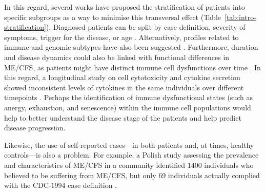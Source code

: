 In this regard, several works have proposed the stratification of \cfs patients into specific subgroups as a way to minimise this transversal effect (Table~\ref{tab:intro-stratification}).
Diagnosed patients can be split by case definition, severity of symptoms, trigger for the disease, or age \citep{janal2006SubtypingCFS, lewis2013ChronicFatigue, hardcastle2014AnalysisRelationship, domingues2021HerpesvirusesSerologya}.
Alternatively, profiles related to immune and genomic subtypes have also been suggested \citep{kerr2007SevenGenomic, kerr2008GeneExpression, vegaIntegrationDNAMethylation2018}.
Furthermore, duration and disease dynamics could also be linked with functional differences in ME/CFS, as patients might have distinct immune cell dysfunctions over time \citep{maya2023SurveyingMetabolic}.
In this regard, a longitudinal study on cell cytotoxicity and cytokine secretion showed inconsistent levels of cytokines in the same individuals over different timepoints \citep{brenu2012LongitudinalInvestigation}.
Perhaps the identification of immune dysfunctional states (such as anergy, exhaustion, and senescence) within the immune cell populations would help to better understand the disease stage of the patients and help predict disease progression.

Likewise, the use of self-reported cases---in both patients and, at times, healthy controls---is also a problem.
For example, a Polish study assessing the prevalence and characteristics of ME/CFS in a community identified 1400 individuals who believed to be suffering from ME/CFS, but only 69 individuals actually complied with the CDC-1994 case definition \citep{slomko2019PrevalenceCharacteristics}.

